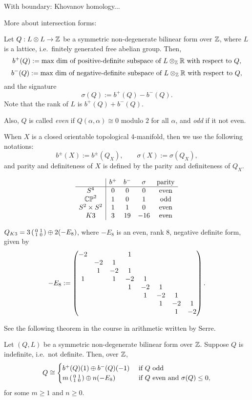 \documentclass{../../../small}
\begin{document}
With boundary: Khovanov homology...


More about intersection forms:
\begin{defn}
Let $Q:L\otimes L\to\Z$ be a symmetric non-degenerate bilinear form over $\Z$, where $L$ is a lattice, i.e.~finitely generated free abelian group.
Then,
\[b^+(Q):=\text{max dim of positive-definite subspace of $L\otimes_\Z\R$ with respect to $Q$},\]
\[b^-(Q):=\text{max dim of negative-definite subspace of $L\otimes_\Z\R$ with respect to $Q$},\]
and the signature
\[\sigma(Q):=b^+(Q)-b^-(Q).\]
Note that the rank of $L$ is $b^+(Q)+b^-(Q)$.

Also, $Q$ is called \emph{even} if $Q(\alpha,\alpha)\cong0$ modulo $2$ for all $\alpha$, and \emph{odd} if it not even.

When $X$ is a closed orientable topological 4-manifold, then we use the following notations:
\[b^\pm(X):=b^\pm(Q_X),\qquad\sigma(X):=\sigma(Q_X),\]
and parity and definiteness of $X$ is defined by the parity and definiteness of $Q_X$.
\end{defn}

\begin{ex}
\[\begin{array}{c|cccc}
&b^+&b^-&\sigma&\text{parity}\\\hline
S^4&0&0&0&\text{even}\\
\CP^2&1&0&1&\text{odd}\\
S^2\times S^2&1&1&0&\text{even}\\
K3&3&19&-16&\text{even}
\end{array}\]
\end{ex}

\begin{exe}
$Q_{K3}=3\left(\mat[small]{0&1\\1&0}\right)\oplus2(-E_8)$, where $-E_8$ is an even, rank 8, negative definite form, given by
\[-E_8:=\mat{
-2&&&1&&&&\\
&-2&1&&&&&\\
&1&-2&1&&&&\\
1&&1&-2&1&&&\\
&&&1&-2&1&&\\
&&&&1&-2&1&\\
&&&&&1&-2&1\\
&&&&&&1&-2
}.\]
\end{exe}
See the following theorem in the course in arithmetic written by Serre.
\begin{thm}
Let $(Q,L)$ be a symmetric non-degenerate bilinear form over $\Z$.
Suppose $Q$ is indefinite, i.e.~not definite.
Then, over $\Z$,
\[Q\cong\begin{cases}
b^+(Q)(1)\oplus b^-(Q)(-1)&\text{ if $Q$ odd}\\
m\left(\mat[small]{0&1\\1&0}\right)\oplus n(-E_8)&\text{ if $Q$ even and $\sigma(Q)\le0$},
\end{cases}\]
for some $m\ge1$ and $n\ge0$.
\end{thm}
\end{document}
